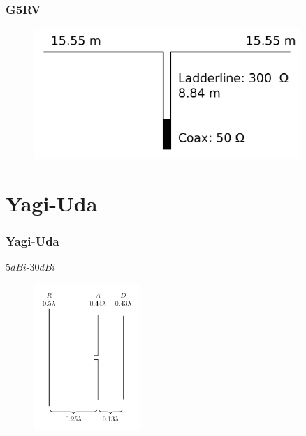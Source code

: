 \begin{frame}
  \frametitle{G5RV}
  \begin{center}
    \begin{figure}
      \includegraphics[width=0.9\textwidth,height=.75\textheight,keepaspectratio]{e11/G5RV_Antenna.png}
    \end{figure}
  \end{center}
\end{frame}


\section*{Yagi-Uda}

\begin{frame}
  \frametitle{Yagi-Uda}
  $5dBi$-$30dBi$
  \begin{center}
    \begin{figure}
      \includegraphics[width=0.36\textwidth,height=.7\textheight,keepaspectratio]{e11/Yagi_3_element.png}
    \end{figure}
  \end{center}
\end{frame}


